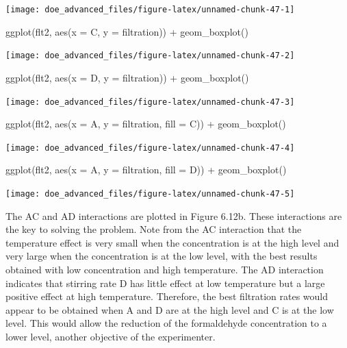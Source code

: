\documentclass[
]{book}
\newenvironment{Shaded}{\begin{snugshade}}{\end{snugshade}}
\newcommand{\AttributeTok}[1]{\textcolor[rgb]{0.77,0.63,0.00}{#1}}
\newcommand{\FunctionTok}[1]{\textcolor[rgb]{0.00,0.00,0.00}{#1}}
\newcommand{\NormalTok}[1]{#1}
\newcommand{\SpecialCharTok}[1]{\textcolor[rgb]{0.00,0.00,0.00}{#1}}
\begin{document}
\texttt{[image: doe\_advanced\_files/figure-latex/unnamed-chunk-47-1]}

\begin{Shaded}
\begin{Highlighting}[]
\FunctionTok{ggplot}\NormalTok{(flt2, }\FunctionTok{aes}\NormalTok{(}\AttributeTok{x =}\NormalTok{ C, }\AttributeTok{y =}\NormalTok{ filtration)) }\SpecialCharTok{+}
  \FunctionTok{geom\_boxplot}\NormalTok{()}
\end{Highlighting}
\end{Shaded}

\texttt{[image: doe\_advanced\_files/figure-latex/unnamed-chunk-47-2]}

\begin{Shaded}
\begin{Highlighting}[]
\FunctionTok{ggplot}\NormalTok{(flt2, }\FunctionTok{aes}\NormalTok{(}\AttributeTok{x =}\NormalTok{ D, }\AttributeTok{y =}\NormalTok{ filtration)) }\SpecialCharTok{+}
  \FunctionTok{geom\_boxplot}\NormalTok{()}
\end{Highlighting}
\end{Shaded}

\texttt{[image: doe\_advanced\_files/figure-latex/unnamed-chunk-47-3]}

\begin{Shaded}
\begin{Highlighting}[]
\FunctionTok{ggplot}\NormalTok{(flt2, }\FunctionTok{aes}\NormalTok{(}\AttributeTok{x =}\NormalTok{ A, }\AttributeTok{y =}\NormalTok{ filtration, }\AttributeTok{fill =}\NormalTok{ C)) }\SpecialCharTok{+}
  \FunctionTok{geom\_boxplot}\NormalTok{()}
\end{Highlighting}
\end{Shaded}

\texttt{[image: doe\_advanced\_files/figure-latex/unnamed-chunk-47-4]}

\begin{Shaded}
\begin{Highlighting}[]
\FunctionTok{ggplot}\NormalTok{(flt2, }\FunctionTok{aes}\NormalTok{(}\AttributeTok{x =}\NormalTok{ A, }\AttributeTok{y =}\NormalTok{ filtration, }\AttributeTok{fill =}\NormalTok{ D)) }\SpecialCharTok{+}
  \FunctionTok{geom\_boxplot}\NormalTok{()}
\end{Highlighting}
\end{Shaded}

\texttt{[image: doe\_advanced\_files/figure-latex/unnamed-chunk-47-5]}

The AC and AD interactions are plotted in Figure 6.12b. These interactions are the key to solving the problem. Note from the AC interaction that the temperature effect is very small when the concentration is at the high level and very large when the concentration is at the low level, with the best results obtained with low concentration and high temperature. The AD interaction indicates that stirring rate D has little effect at low temperature but a large positive effect at high temperature. Therefore, the best filtration rates would appear to be obtained when A and D are at the high level and C is at the low level. This would allow the reduction of the formaldehyde concentration to a lower level, another objective of the experimenter.
\end{document}
